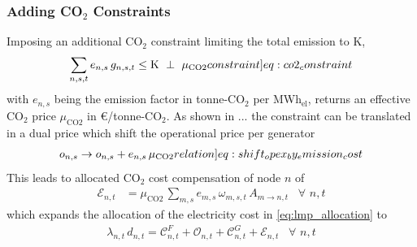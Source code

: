 \documentclass[11pt,twocolumn]{article}
\newcommand{\generation}[1][n]{g_{#1,s,t}}
\newcommand{\generationshare}[1][n]{\omega_{#1,s,t}}
\newcommand{\capacityGeneration}{G_{n,s}}
\newcommand{\capexGeneration}{c_{n,s}}
\newcommand{\opexGeneration}[1][n]{o_{#1,s}}
\newcommand{\nodaldemand}[1][n]{d_{#1,t}}
\newcommand{\lmp}[1][n]{\lambda_{#1,t}}
\newcommand{\allocatePeer}[1][m \rightarrow n]{A_{#1,t}}
\newcommand{\allocateCapexGeneration}[1][n]{\mathcal{C}^{G}_{#1,t}}
\newcommand{\allocateCapexFlow}[1][n]{\mathcal{C}^{F}_{#1,t}}
\newcommand{\allocateOpex}[1][n]{\mathcal{O}_{#1,t}}
\newcommand{\allocateEmissionCost}[1][n]{\mathcal{E}_{#1,t}}
\newcommand{\emission}[1][n]{e_{#1,s}}
\newcommand{\emissionPrice}{\mu_{\text{CO2}}}
\newcommand{\megawatthour}{MWh$_\text{el}$}
\newcommand{\resultsin}[1]{\hspace{6pt} \bot  \hspace{6pt} #1}
\newcommand{\Forall}[1]{\hspace{10pt} \forall \,\, #1 }
\begin{document}
\subsubsection*{Adding CO$_2$ Constraints}

Imposing an additional CO$_2$ constraint limiting the total emission to K,  
\begin{align}
 \sum_{n,s,t} \emission \, \generation \le \text{K} \resultsin{\emissionPrice} 
 \label[constraint]{eq:co2_constraint}
\end{align}
with $\emission$ being the emission factor in tonne-CO$_2$ per \megawatthour, returns an effective CO$_2$ price $\emissionPrice$ in \euro/tonne-CO$_2$. 
% 
As shown in ... the constraint can be translated in a dual price which shift the operational price per generator
\begin{align}
\opexGeneration \rightarrow \opexGeneration + \emission \, \emissionPrice \label[relation]{eq:shift_opex_by_emission_cost}
\end{align}
This leads to allocated CO$_2$ cost compensation of node $n$ of
 \begin{align}
 \allocateEmissionCost &= \emissionPrice \, \sum_{m,s} \emission[m] \, \generationshare[m] \, \allocatePeer \Forall{n,t} \label{eq:allocate_emissionPrice}
\end{align}
which expands the allocation of the electricity cost in \cref{eq:lmp_allocation} to 
\begin{align}
 \lmp \, \nodaldemand = \allocateCapexFlow + \allocateOpex + \allocateCapexGeneration  + \allocateEmissionCost \Forall{n,t}
 \label{eq:lmp_allocation_with_emission}
\end{align}
\end{document}
